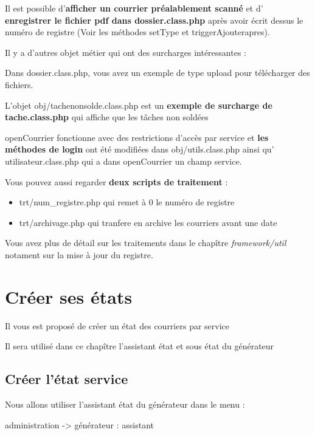 \documentclass[letterpaper,10pt,french]{manual}
\begin{document}
Il est possible d'\textbf{afficher un courrier préalablement scanné} et d'
\textbf{enregistrer le fichier pdf dans dossier.class.php} après avoir écrit dessus
le numéro de registre (Voir les méthodes setType et triggerAjouterapres).

Il y a d'autres objet métier qui ont des surcharges intéressantes :

Dans dossier.class.php, vous avez un exemple de type upload pour télécharger des
fichiers.

L'objet obj/tachenonsolde.class.php est un \textbf{exemple de surcharge de tache.class.php}
qui affiche que les tâches non soldées

openCourrier fonctionne avec des restrictions d'accès par service et \textbf{les
méthodes de login} ont été modifiées dans obj/utils.class.php ainsi qu'
utilisateur.class.php qui a dans openCourrier un champ service.

Vous pouvez aussi regarder \textbf{deux scripts de traitement} :
\begin{itemize}
\item {} 
trt/num\_registre.php qui remet à 0 le numéro de registre

\item {} 
trt/archivage.php qui tranfere en archive les courriers avant une date

\end{itemize}

Vous avez plus de détail sur les traitements dans le chapître
\emph{framework/util} notament sur la mise à jour du registre.

\resetcurrentobjects
\hypertarget{--doc-utilisation/utiliser_assistant}{}

\hypertarget{utiliser-assistant}{}\section{Créer ses états}

Il vous est proposé de créer un état des courriers par service

Il sera utilisé dans ce chapître l'assistant état et sous état du générateur


\subsection{Créer l'état service}

Nous allons utiliser l'assistant état du générateur dans le menu :

administration -\textgreater{} générateur  : assistant
\end{document}
